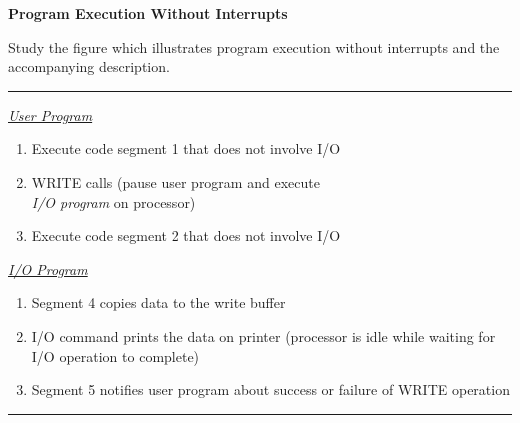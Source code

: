 \documentclass{article}
\begin{document}
\begin{examplebox}
\textbf{Program Execution Without Interrupts}

Study the figure which illustrates program execution without interrupts and the accompanying description.

\noindent\rule{\textwidth}{0.4pt}

\begin{minipage}{0.65\textwidth}


\textit{\underline{User Program}}
\begin{enumerate}
    \item Execute code segment 1 that does not involve I/O
    \item WRITE calls (pause user program and execute \\ \textit{I/O program} on processor)
    \item Execute code segment 2 that does not involve I/O
\end{enumerate}


\textit{\underline{I/O Program}}
\begin{enumerate}
    \item Segment 4 copies data to the write buffer
    \item I/O command prints the data on printer (processor is idle while waiting for I/O operation to complete)
    \item Segment 5 notifies user program about success or failure of WRITE operation
\end{enumerate}
\noindent\rule{\textwidth}{0.4pt}


\end{minipage}
\end{examplebox}
\end{document}
